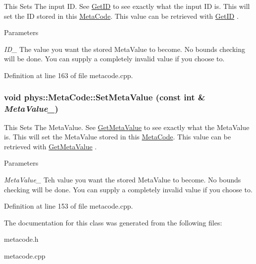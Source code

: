 This Sets The input ID. See \hyperlink{classphys_1_1MetaCode_a70389ebd99493248fe93c598e2fe06c9}{GetID} to see exactly what the input ID is. This will set the ID stored in this \hyperlink{classphys_1_1MetaCode}{MetaCode}. This value can be retrieved with \hyperlink{classphys_1_1MetaCode_a70389ebd99493248fe93c598e2fe06c9}{GetID} . 
\begin{DoxyParams}{Parameters}
\item[{\em ID\_\-}]The value you want the stored MetaValue to become. No bounds checking will be done. You can supply a completely invalid value if you choose to. \end{DoxyParams}


Definition at line 163 of file metacode.cpp.\hypertarget{classphys_1_1MetaCode_a31a6390626b08c1bbf08e3f68d2ea764}{
\subsubsection[{SetMetaValue}]{\setlength{\rightskip}{0pt plus 5cm}void phys::MetaCode::SetMetaValue (const int \& {\em MetaValue\_\-})}}
\label{da/dc9/classphys_1_1MetaCode_a31a6390626b08c1bbf08e3f68d2ea764}


This Sets The MetaValue. See \hyperlink{classphys_1_1MetaCode_ad8e7e4e7c6cdc6a05b8522910ce90cd4}{GetMetaValue} to see exactly what the MetaValue is. This will set the MetaValue stored in this \hyperlink{classphys_1_1MetaCode}{MetaCode}. This value can be retrieved with \hyperlink{classphys_1_1MetaCode_ad8e7e4e7c6cdc6a05b8522910ce90cd4}{GetMetaValue} . 
\begin{DoxyParams}{Parameters}
\item[{\em MetaValue\_\-}]Teh value you want the stored MetaValue to become. No bounds checking will be done. You can supply a completely invalid value if you choose to. \end{DoxyParams}


Definition at line 153 of file metacode.cpp.

The documentation for this class was generated from the following files:\begin{DoxyCompactItemize}
\item 
metacode.h\item 
metacode.cpp\end{DoxyCompactItemize}
